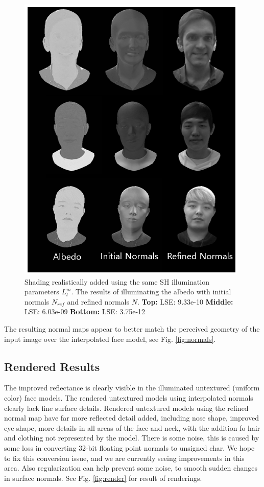 \documentclass[10pt,twocolumn,letterpaper]{article}
\begin{document}
\begin{figure}[!h]
    \begin{center}
        \includegraphics [scale=0.75] {image/grey-sh.png}
    \end{center}
    \caption{Shading realistically added using the same SH illumination parameters $L_l^m$. The results of illuminating the albedo with initial normals $N_{ref}$ and refined normals $N$. \textbf{Top:} LSE: 9.33e-10 \textbf{Middle:} LSE: 6.03e-09 \textbf{Bottom:} LSE: 3.75e-12}
    \label{fig:grey}
\end{figure} 
The resulting normal maps appear to better match the perceived geometry of the input image over the interpolated face model, see Fig. \ref{fig:normals}.

\subsection{Rendered Results} \label{sec:render}
The improved reflectance is clearly visible in the illuminated untextured (uniform color) face models. The rendered untextured models using interpolated normals clearly lack fine surface details. Rendered untextured models using the refined normal map have far more reflected detail added, including nose shape, improved eye shape, more details in all areas of the face and neck, with the addition fo hair and clothing not represented by the model. There is some noise, this is caused by some loss in converting 32-bit floating point normals to unsigned char. We hope to fix this conversion issue, and we are currently seeing improvements in this area. Also regularization can help prevent some noise, to smooth sudden changes in surface normals. See Fig. \ref{fig:render} for result of renderings.
\end{document}
